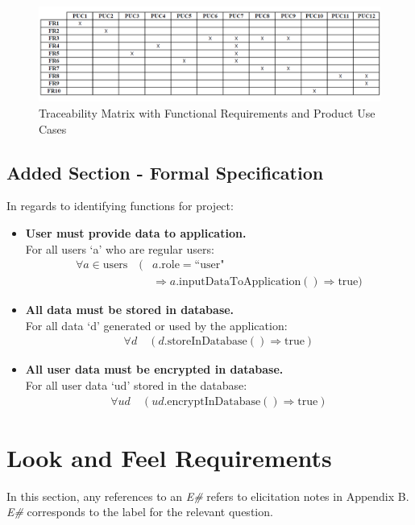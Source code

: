 \documentclass[12pt]{article}
\begin{document}
\begin{figure}[H]
  \centering
  \includegraphics[width=\textwidth]{traceabilitymatrix}
  \caption{Traceability Matrix with Functional Requirements and Product Use Cases}
  \label{fig:traceabilitymatrix}
\end{figure}

\subsection{Added Section - Formal Specification}
In regards to identifying functions for project:
\begin{itemize}
    \item \textbf{User must provide data to application.}\\
    For all users `a' who are regular users:
    \[
    \begin{split}
        \forall a \in \text{users} \quad (& a.\text{role} = \text{``user"}\\
        & \Rightarrow a.\text{inputDataToApplication}() \Rightarrow \text{true})
    \end{split}
    \]

    \item \textbf{All data must be stored in database.}\\
    For all data `d' generated or used by the application:
    \[
    \begin{split}
        \forall d \quad (d.\text{storeInDatabase}() \Rightarrow \text{true})
    \end{split}
    \]
    
    \item \textbf{All user data must be encrypted in database.}\\
    For all user data `ud' stored in the database:
    \[
    \begin{split}
        \forall ud \quad (ud.\text{encryptInDatabase}() \Rightarrow \text{true})
    \end{split}
    \]
    
\end{itemize}

\section{Look and Feel Requirements}
In this section, any references to an \textit{E\#} refers to elicitation notes in Appendix B. \textit{E\#} corresponds
to the label for the relevant question.
\end{document}
